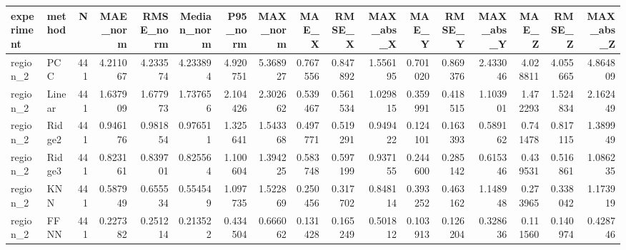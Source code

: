 \begin{tabular}{llrrrrrrrrrrrrrrr}
\toprule
experiment & method & N & MAE_norm & RMSE_norm & Median_norm & P95_norm & MAX_norm & MAE_X & RMSE_X & MAX_abs_X & MAE_Y & RMSE_Y & MAX_abs_Y & MAE_Z & RMSE_Z & MAX_abs_Z \\
\midrule
region_2 & PCC & 441 & 4.211067 & 4.233574 & 4.233894 & 4.920751 & 5.368927 & 0.767556 & 0.847892 & 1.556195 & 0.701020 & 0.869376 & 2.433046 & 4.028811 & 4.055665 & 4.864809 \\
region_2 & Linear & 441 & 1.637909 & 1.677973 & 1.737656 & 2.104426 & 2.302662 & 0.539467 & 0.561534 & 1.029815 & 0.359991 & 0.418515 & 1.103901 & 1.472293 & 1.524834 & 2.162449 \\
region_2 & Ridge2 & 441 & 0.946176 & 0.981854 & 0.976511 & 1.325641 & 1.543368 & 0.497771 & 0.519291 & 0.949422 & 0.124101 & 0.163393 & 0.589162 & 0.741478 & 0.817115 & 1.389949 \\
region_2 & Ridge3 & 441 & 0.823161 & 0.839701 & 0.825564 & 1.100604 & 1.394225 & 0.583748 & 0.597199 & 0.937155 & 0.244600 & 0.285142 & 0.615346 & 0.439531 & 0.516861 & 1.086235 \\
region_2 & KNN & 441 & 0.587949 & 0.655534 & 0.554549 & 1.097735 & 1.522869 & 0.250456 & 0.317702 & 0.848114 & 0.393252 & 0.463162 & 1.148948 & 0.273965 & 0.338042 & 1.173919 \\
region_2 & FFNN & 441 & 0.227382 & 0.251214 & 0.213522 & 0.434504 & 0.666062 & 0.131428 & 0.165249 & 0.501812 & 0.103913 & 0.126204 & 0.328636 & 0.111560 & 0.140974 & 0.428746 \\
\bottomrule
\end{tabular}
